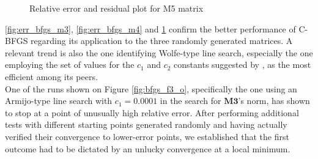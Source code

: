 \documentclass{article}
\numberwithin{equation}{section}
\begin{document}
\begin{figure}[H]
    \centering
  \hfill
  \caption{Relative error and residual plot for M5 matrix}
    \label{fig:err_bfgs_m5}
\end{figure}

 \ref{fig:err_bfgs_m3}, \ref{fig:err_bfgs_m4} and \ref{fig:err_bfgs_m5} confirm the better performance of C-BFGS regarding its application to the three randomly generated matrices. A relevant trend is also the one identifying Wolfe-type line search, especially the one employing the set of values for the $c_1$ and $c_2$ constants suggested by \cite{LiFukushimaA}, as the most efficient among its peers.\\ 
 
 One of the runs shown on Figure \ref{fig:bfgs_f3_o}, specifically the one using an Armijo-type line search with $c_1=0.0001$ in the search for $\textbf{M3}$'s norm, has shown to stop at a point of unusually high relative error. After performing additional tests with different starting points generated randomly and having actually verified their convergence to lower-error points, we established that the first outcome had to be dictated by an unlucky convergence at a local minimum. 
\end{document}
